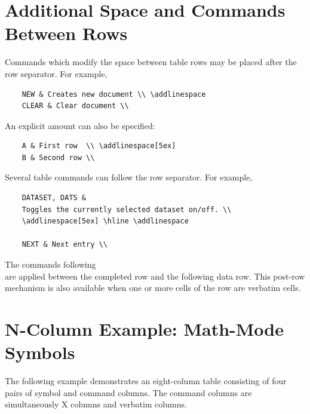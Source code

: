 \documentclass[
11pt,
a4paper,
oneside
]{scrbook}
\begin{document}
{%
\section{Additional Space and Commands Between Rows}

Commands which modify the space between table rows may be placed after the
row separator.
For example,
\begin{verbatim}
	NEW & Creates new document \\ \addlinespace
	CLEAR & Clear document \\
\end{verbatim}
An explicit amount can also be specified:
\begin{verbatim}
	A & First row  \\ \addlinespace[5ex]
	B & Second row \\
\end{verbatim}
Several table commands can follow the row separator. For example,
\begin{verbatim}
	DATASET, DATS &
	Toggles the currently selected dataset on/off. \\
	\addlinespace[5ex] \hline \addlinespace
	
	NEXT & Next entry \\
\end{verbatim}
The commands following \texttt{\string\\} are applied between the completed
row and the following data row.
This post-row mechanism is also available when one or more cells of the row
are verbatim cells.

\section{N-Column Example: Math-Mode Symbols}

The following example demonstrates an eight-column table consisting of four
pairs of symbol and command columns. The command columns are simultaneously
X columns and verbatim columns.

{\small
	\begin{ReferenceTable}[
		caption={\LaTeX{} Math Symbols},
		label={tab:LaTeXmathSymbols},
		area=full,
		columns=8,
		headers=row,
		xcolumn=2+4+6+8,
		verbatimcolumn=2+4+6+8
		]
		

\end{ReferenceTable}}}
\end{document}
